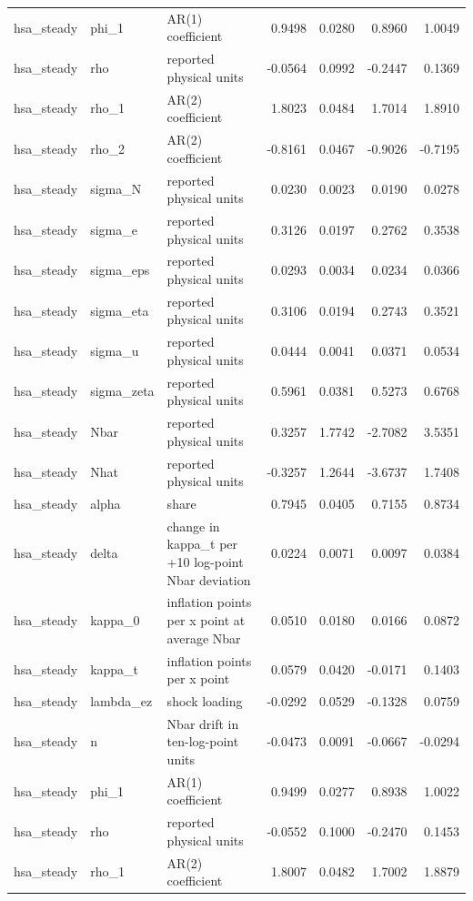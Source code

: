 \begin{tabular}{lllrrrr}
hsa\_steady & phi\_1 & AR(1) coefficient & 0.9498 & 0.0280 & 0.8960 & 1.0049 \\
hsa\_steady & rho & reported physical units & -0.0564 & 0.0992 & -0.2447 & 0.1369 \\
hsa\_steady & rho\_1 & AR(2) coefficient & 1.8023 & 0.0484 & 1.7014 & 1.8910 \\
hsa\_steady & rho\_2 & AR(2) coefficient & -0.8161 & 0.0467 & -0.9026 & -0.7195 \\
hsa\_steady & sigma\_N & reported physical units & 0.0230 & 0.0023 & 0.0190 & 0.0278 \\
hsa\_steady & sigma\_e & reported physical units & 0.3126 & 0.0197 & 0.2762 & 0.3538 \\
hsa\_steady & sigma\_eps & reported physical units & 0.0293 & 0.0034 & 0.0234 & 0.0366 \\
hsa\_steady & sigma\_eta & reported physical units & 0.3106 & 0.0194 & 0.2743 & 0.3521 \\
hsa\_steady & sigma\_u & reported physical units & 0.0444 & 0.0041 & 0.0371 & 0.0534 \\
hsa\_steady & sigma\_zeta & reported physical units & 0.5961 & 0.0381 & 0.5273 & 0.6768 \\
hsa\_steady & Nbar & reported physical units & 0.3257 & 1.7742 & -2.7082 & 3.5351 \\
hsa\_steady & Nhat & reported physical units & -0.3257 & 1.2644 & -3.6737 & 1.7408 \\
hsa\_steady & alpha & share & 0.7945 & 0.0405 & 0.7155 & 0.8734 \\
hsa\_steady & delta & change in kappa\_t per +10 log-point Nbar deviation & 0.0224 & 0.0071 & 0.0097 & 0.0384 \\
hsa\_steady & kappa\_0 & inflation points per x point at average Nbar & 0.0510 & 0.0180 & 0.0166 & 0.0872 \\
hsa\_steady & kappa\_t & inflation points per x point & 0.0579 & 0.0420 & -0.0171 & 0.1403 \\
hsa\_steady & lambda\_ez & shock loading & -0.0292 & 0.0529 & -0.1328 & 0.0759 \\
hsa\_steady & n & Nbar drift in ten-log-point units & -0.0473 & 0.0091 & -0.0667 & -0.0294 \\
hsa\_steady & phi\_1 & AR(1) coefficient & 0.9499 & 0.0277 & 0.8938 & 1.0022 \\
hsa\_steady & rho & reported physical units & -0.0552 & 0.1000 & -0.2470 & 0.1453 \\
hsa\_steady & rho\_1 & AR(2) coefficient & 1.8007 & 0.0482 & 1.7002 & 1.8879 \\

\end{tabular}
